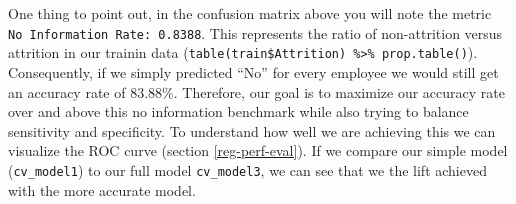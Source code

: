 \documentclass[]{book}
\newenvironment{Shaded}{\begin{snugshade}}{\end{snugshade}}
\newcommand{\CommentTok}[1]{\textcolor[rgb]{0.56,0.35,0.01}{\textit{#1}}}
\newcommand{\DataTypeTok}[1]{\textcolor[rgb]{0.13,0.29,0.53}{#1}}
\newcommand{\DecValTok}[1]{\textcolor[rgb]{0.00,0.00,0.81}{#1}}
\newcommand{\FloatTok}[1]{\textcolor[rgb]{0.00,0.00,0.81}{#1}}
\newcommand{\KeywordTok}[1]{\textcolor[rgb]{0.13,0.29,0.53}{\textbf{#1}}}
\newcommand{\NormalTok}[1]{#1}
\newcommand{\OperatorTok}[1]{\textcolor[rgb]{0.81,0.36,0.00}{\textbf{#1}}}
\newcommand{\OtherTok}[1]{\textcolor[rgb]{0.56,0.35,0.01}{#1}}
\newcommand{\StringTok}[1]{\textcolor[rgb]{0.31,0.60,0.02}{#1}}
\theoremstyle{definition}
\theoremstyle{definition}
\theoremstyle{definition}
\theoremstyle{remark}
\begin{document}
One thing to point out, in the confusion matrix above you will note the
metric \texttt{No\ Information\ Rate:\ 0.8388}. This represents the
ratio of non-attrition versus attrition in our trainin data
(\texttt{table(train\$Attrition)\ \%\textgreater{}\%\ prop.table()}).
Consequently, if we simply predicted ``No'' for every employee we would
still get an accuracy rate of 83.88\%. Therefore, our goal is to
maximize our accuracy rate over and above this no information benchmark
while also trying to balance sensitivity and specificity. To understand
how well we are achieving this we can visualize the ROC curve (section
\ref{reg-perf-eval}). If we compare our simple model
(\texttt{cv\_model1}) to our full model \texttt{cv\_model3}, we can see
that we the lift achieved with the more accurate model.

\begin{Shaded}
\end{Shaded}
\end{document}

